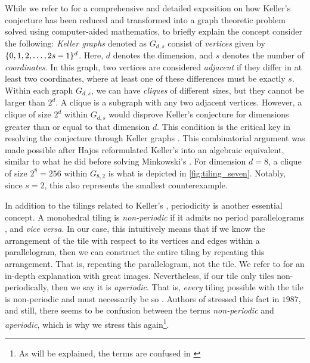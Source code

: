 \documentclass[../thesis.tex]{subfiles}
\begin{document}
While we refer to \cite{brakensiekResolutionKellerConjecture2020} for a comprehensive and detailed exposition on how Keller's conjecture has been reduced and transformed into a graph theoretic problem solved using computer-aided mathematics, to briefly explain the concept consider the following: \emph{Keller graphs} denoted as $G_{d,s}$ consist of \emph{vertices} given by $\{0,1,2,\dots,2s-1\}^d$. Here, $d$ denotes the dimension, and $s$ denotes the number of \emph{coordinates}. In this graph, two vertices are considered \emph{adjacent} if they differ in at least two coordinates, where at least one of these differences must be exactly $s$. Within each graph $G_{d,s}$, we can have \emph{cliques} of different sizes, but they cannot be larger than $2^d$. A clique is a subgraph with any two adjacent vertices. However, a clique of size $2^d$ within $G_{d,s}$ would disprove Keller's conjecture for dimensions greater than or equal to that dimension $d$. This condition is the critical key in resolving the conjecture through Keller graphs \cite{corradiCombinatorialApproachKeller1990}. This combinatorial argument was made possible after Hajos reformulated Keller's  into an algebraic equivalent, similar to what he did before solving Minkowski's  \cite{lagariasKellerCubetilingConjecture1992,hajosUeberEinfacheUnd1942}. For dimension $d=8$, a clique of size $2^8=256$ within $G_{8,2}$ is what is depicted in \cref{fig:tiling_seven}. Notably, since $s=2$, this also represents the smallest counterexample. %


In addition to the tilings related to Keller's , periodicity is another essential concept. A monohedral tiling is \emph{non-periodic} if it admits no period parallelograms \cite{penrosePentaplexityClassNonPeriodic1979}, and \emph{vice versa}. In our case, this intuitively means that if we know the arrangement of the tile with respect to its vertices and edges within a parallelogram, then we can construct the entire tiling by repeating this arrangement. That is, repeating the parallelogram, not the tile. We refer to \cite[p.29-30]{grunbaumTilingsPatterns1987} for an in-depth explanation with great images. Nevertheless, if our tile only tiles non-periodically, then we say it is \emph{aperiodic}. That is, \emph{every} tiling possible with the tile is non-periodic and must necessarily be so \cite[p. 520]{grunbaumTilingsPatterns1987}. Authors of \cite{grunbaumTilingsPatterns1987} stressed this fact in $1987$, and still, there seems to be confusion between the terms \emph{non-periodic} and \emph{aperiodic}, which is why we stress this again\footnote[1]{As will be explained, the terms are confused in \cite{lagariasOrthonormalBasesExponentials2000,liuUniformityNonUniformGabor2003}}.
\end{document}
